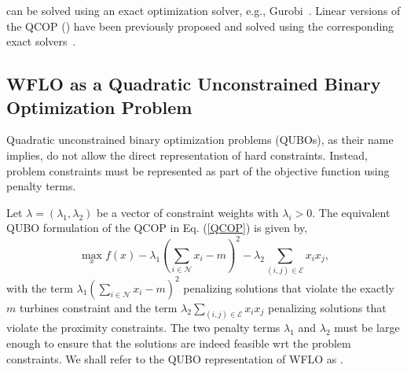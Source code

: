 \documentclass[preprint,12pt]{elsarticle}
\newcommand{\todo}[1]{{\textcolor{red}{\bf {#1}}}}
\newcommand{\qcls}{{\sf {\small QC-LS\xspace}}}
\newcommand{\quls}{{\sf {\small QU-LS\xspace}}}
\begin{document}
\qcls{} can be solved using an exact optimization solver, e.g., Gurobi~\cite{gurobi}. 
Linear versions of the QCOP (\qcls) have been previously proposed and solved using the corresponding exact solvers~\cite{Zhang2014,donovan2005wind}.



\subsection{WFLO as a Quadratic Unconstrained Binary Optimization Problem}

Quadratic unconstrained binary optimization problems (QUBOs), as their name implies, do not allow the direct representation of hard constraints. Instead, 
problem constraints must be represented as part of the objective function
using penalty terms. 

Let $\lambda = (\lambda_1,\lambda_2)$ 
be a vector of constraint weights with $\lambda_i >0$. The equivalent QUBO formulation of the QCOP in Eq. (\ref{QCOP}) is given by,
\begin{equation}\max_{x}^{} f(x) - \lambda_1 (\sum_{i \in \mathcal{N}}^{} x_i -m) ^2 - \lambda_2 \sum_{(i,j) \in \mathcal{E}}^{} x_i x_j , \label{QUBO}\end{equation}
with the term $ \lambda_1 (\sum_{i \in \mathcal{N}}^{} x_i -m) ^2$ 
penalizing solutions that violate the exactly $m$ turbines constraint and the term $\lambda_2 \sum_{(i,j) \in \mathcal{E}}^{} x_i x_j$ penalizing
solutions that violate the proximity constraints. The two penalty terms $\lambda_1$ and $\lambda_2$ 
must be large enough to ensure that the solutions are indeed feasible wrt the problem constraints. We shall refer to the QUBO representation of WFLO as \quls.
\end{document}
